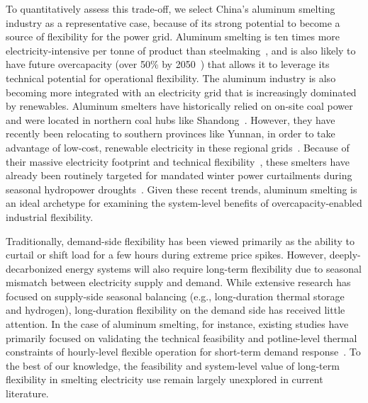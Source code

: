 \documentclass[preprint]{elsarticle}
\begin{document}
To quantitatively assess this trade-off, we select China’s aluminum smelting industry as a representative case, because of its strong potential to become a source of flexibility for the power grid. Aluminum smelting is ten times more electricity-intensive per tonne of product than steelmaking~\citep{IAI2023Smelting, Hasanbeigi2019}, and is also likely to have future overcapacity (over 50\% by 2050~\citep{li_when_2020, song_chinas_2023, eheliyagoda2022role, zhang_global_2024}) that allows it to leverage its technical potential for operational flexibility. The aluminum industry is also becoming more integrated with an electricity grid that is increasingly dominated by renewables. Aluminum smelters have historically relied on on-site coal power and were located in northern coal hubs like Shandong~\citep{nakano_decarbonizing_2022}. However, they have recently been relocating to southern provinces like Yunnan, in order to take advantage of low-cost, renewable electricity in these regional grids~\citep{samadi_renewables_2023}. Because of their massive electricity footprint and technical flexibility~\citep{todd2008providing}, these smelters have already been routinely targeted for mandated winter power curtailments during seasonal hydropower droughts~\citep{alcircle_yunnan_cuts_2024}. Given these recent trends, aluminum smelting is an ideal archetype for examining the system-level benefits of overcapacity-enabled industrial flexibility.

Traditionally, demand-side flexibility has been viewed primarily as the ability to curtail or shift load for a few hours during extreme price spikes. However, deeply-decarbonized energy systems will also require long-term flexibility due to seasonal mismatch between electricity supply and demand. While extensive research has focused on supply-side seasonal balancing (e.g., long-duration thermal storage and hydrogen), long-duration flexibility on the demand side has received little attention. In the case of aluminum smelting, for instance, existing studies have primarily focused on validating the technical feasibility and potline-level thermal constraints of hourly-level flexible operation for short-term demand response~\citep{todd2008providing, wong_studies_2023, tabereaux_loss_2016, driscoll_economics_2016}. To the best of our knowledge, the feasibility and system-level value of long-term flexibility in smelting electricity use remain largely unexplored in current literature.
\end{document}
